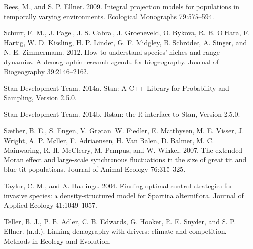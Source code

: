 \documentclass[12pt,]{article}
\begin{document}
Rees, M., and S. P. Ellner. 2009. Integral projection models for
populations in temporally varying environments. Ecological Monographs
79:575--594.

Schurr, F. M., J. Pagel, J. S. Cabral, J. Groeneveld, O. Bykova, R. B.
O'Hara, F. Hartig, W. D. Kissling, H. P. Linder, G. F. Midgley, B.
Schröder, A. Singer, and N. E. Zimmermann. 2012. How to understand
species' niches and range dynamics: A demographic research agenda for
biogeography. Journal of Biogeography 39:2146--2162.

Stan Development Team. 2014a. Stan: A C++ Library for Probability and
Sampling, Version 2.5.0.

Stan Development Team. 2014b. Rstan: the R interface to Stan, Version
2.5.0.

Sæther, B. E., S. Engen, V. Grøtan, W. Fiedler, E. Matthysen, M. E.
Visser, J. Wright, A. P. Møller, F. Adriaensen, H. {Van Balen}, D.
Balmer, M. C. Mainwaring, R. H. McCleery, M. Pampus, and W. Winkel.
2007. The extended Moran effect and large-scale synchronous fluctuations
in the size of great tit and blue tit populations. Journal of Animal
Ecology 76:315--325.

Taylor, C. M., and A. Hastings. 2004. Finding optimal control strategies
for invasive species: a density-structured model for Spartina
alterniflora. Journal of Applied Ecology 41:1049--1057.

Teller, B. J., P. B. Adler, C. B. Edwards, G. Hooker, R. E. Snyder, and
S. P. Ellner. (n.d.). Linking demography with drivers: climate and
competition. Methods in Ecology and Evolution.
\end{document}
